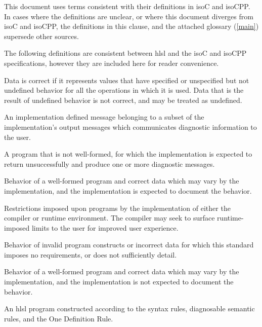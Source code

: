
\p This document uses terms consistent with their definitions in \gls{isoC} and
\gls{isoCPP}. In cases where the definitions are unclear, or where this document
diverges from \gls{isoC} and \gls{isoCPP}, the definitions in this clause, and
the attached glossary (\ref{main}) supersede other sources.


\p The following definitions are consistent between \acrshort{hlsl} and the
\gls{isoC} and \gls{isoCPP} specifications, however they are included here for
reader convenience.

\p Data is correct if it represents values that have specified or unspecified
but not undefined behavior for all the operations in which it is used. Data that
is the result of undefined behavior is not correct, and may be treated as
undefined.

\p An implementation defined message belonging to a subset of the
implementation's output messages which communicates diagnostic information to
the user.

\p A program that is not well-formed, for which the implementation is expected
to return unsuccessfully and produce one or more diagnostic messages.

\p Behavior of a well-formed program and correct data which may vary by the
implementation, and the implementation is expected to document the behavior.

\p Restrictions imposed upon programs by the implementation of either the
compiler or runtime environment. The compiler may seek to surface
runtime-imposed limits to the user for improved user experience.

\p Behavior of invalid program constructs or incorrect data for which this
standard imposes no requirements, or does not sufficiently detail.

\p Behavior of a well-formed program and correct data which may vary by the
implementation, and the implementation is not expected to document the behavior.

\p An \acrshort{hlsl} program constructed according to the syntax rules,
diagnosable semantic rules, and the One Definition Rule.

